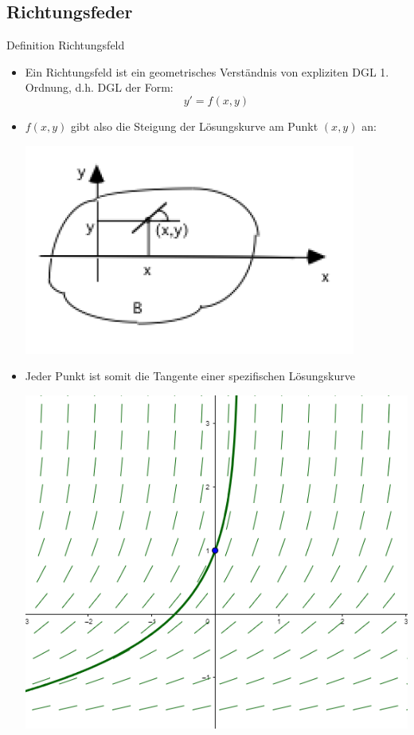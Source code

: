 \subsection{Richtungsfeder}
\begin{definition}{Definition Richtungsfeld}\\
  \begin{itemize}
    \item Ein Richtungsfeld ist ein geometrisches Verständnis von expliziten DGL 1. Ordnung, d.h. DGL der Form:
      \[y'=f(x,y)\]
    \item \(f(x,y)\) gibt also die Steigung der Lösungskurve am Punkt \((x,y)\) an:
  \begin{center}
  \includegraphics[width=0.4\linewidth]{images/Richtungsfeld.png}
  \end{center}
    \item Jeder Punkt ist somit die Tangente einer spezifischen Lösungskurve
  \begin{center}
  \includegraphics[width=0.4\linewidth]{images/RichtungsfeldKurve.png}
  \end{center}
  \end{itemize}
\end{definition}
